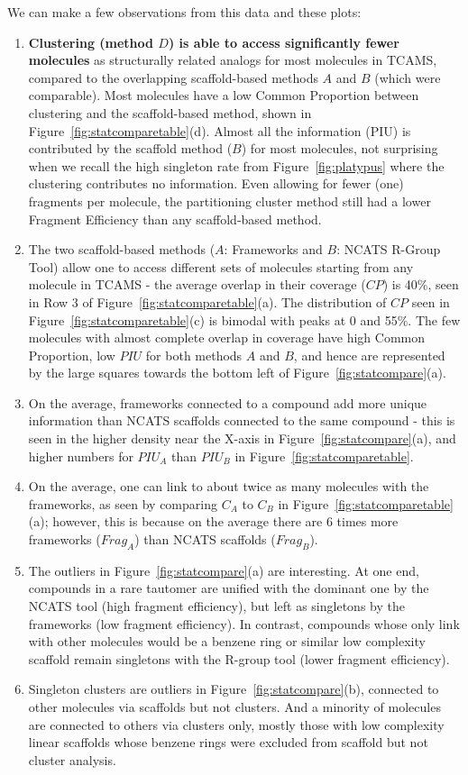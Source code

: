\documentclass[journal=jacsat,biochem,manuscript=article]{achemso}
\newcommand*\fref[1]{Figure~\ref{fig:#1}}
\newcommand*\eg{e.g.,~}
\newcommand*\ie{i.e.,~}
\begin{document}
We can make a few observations from this data and these plots:
\begin{enumerate}
\item {\bf Clustering (method $D$) is able to access significantly fewer molecules} as structurally related analogs for most molecules in TCAMS, compared to the overlapping scaffold-based methods $A$ and $B$ (which were comparable). Most molecules have a low Common Proportion between clustering and the scaffold-based method, shown in \fref{statcomparetable}(d). Almost all the information (PIU) is contributed by the scaffold method ($B$) for most molecules, not surprising when we recall the high singleton rate from \fref{platypus} where the clustering contributes no information. Even allowing for fewer (one) fragments per molecule, the partitioning cluster method still had a lower Fragment Efficiency than any scaffold-based method.  
\item The two scaffold-based methods ($A$: Frameworks and $B$: NCATS R-Group Tool) allow one to access different sets of molecules starting from any molecule in TCAMS - the average overlap in their coverage ($CP$) is 40\%, seen in Row 3 of \fref{statcomparetable}(a).  The distribution of $CP$ seen in  \fref{statcomparetable}(c) is bimodal with peaks at 0 and 55\%. The few molecules with almost complete overlap in coverage have high Common Proportion, low $PIU$ for both methods $A$ and $B$, and hence are represented by the large squares towards the bottom left of \fref{statcompare}(a). 
\item On the average, frameworks connected to a compound add more unique information than NCATS scaffolds connected to the same compound - this is seen in the higher density near the X-axis in \fref{statcompare}(a), and higher numbers for $PIU_A$ than $PIU_B$ in  \fref{statcomparetable}.   
\item On the average, one can link to about twice as many molecules with the frameworks, as seen by comparing $C_A$ to $C_B$ in \fref{statcomparetable}(a); however, this is because on the average there are 6 times more frameworks ($Frag_A$) than NCATS scaffolds ($Frag_B$). %
\item The outliers in \fref{statcompare}(a) are interesting. At one end, compounds in a rare tautomer are unified with the dominant one by the NCATS tool (high fragment efficiency), but left as singletons by the frameworks (low fragment efficiency). In contrast, compounds whose only link with other molecules would be a benzene ring or similar low complexity scaffold remain singletons with the R-group tool (lower fragment efficiency).
\item Singleton clusters are outliers in \fref{statcompare}(b), connected to other molecules via scaffolds but not clusters. And a minority of molecules are connected to others via clusters only, mostly those with low complexity linear scaffolds whose benzene rings were excluded from scaffold but not cluster analysis.    
\end{enumerate}
\end{document}
